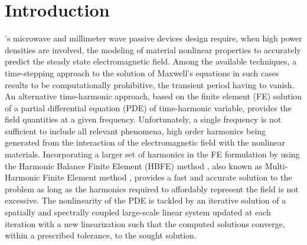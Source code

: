 \documentclass[journal]{IEEEtran}
\begin{document}
\section{Introduction}
% 
% 
% 
% 
% 
's microwave and millimeter wave passive devices design require, when high power densities are involved, the modeling of material nonlinear properties to accurately predict the steady state electromagnetic field.
Among the available techniques, a time-stepping approach to the solution of Maxwell's equations in such cases results to be computationally prohibitive, the transient period having to vanish. %
An alternative time-harmonic approach, based on the finite element (FE) solution of a partial differential equation (PDE) of time-harmonic variable, provides the field quantities at a given frequency. Unfortunately, a single frequency is not sufficient to include all relevant phenomena, high order harmonics being generated from the interaction of the electromagnetic field with the nonlinear materials. Incorporating a larger set of harmonics in the FE formulation by using the Harmonic Balance Finite Element (HBFE) method \cite{Yamada1988,Yamada1989}, also known as Multi-Harmonic Finite Element method \cite{Copeland2010, Bachinger2005, deGersem2001, Kolmbauer2009}, provides a fast and accurate solution to the problem as long as the harmonics required to affordably represent the field is not excessive. The nonlinearity of the PDE is tackled by an iterative solution of a spatially and spectrally coupled large-scale linear system updated at each iteration with a new linearization such that the computed solutions converge, within a prescribed tolerance, to the sought solution. %
\end{document}
